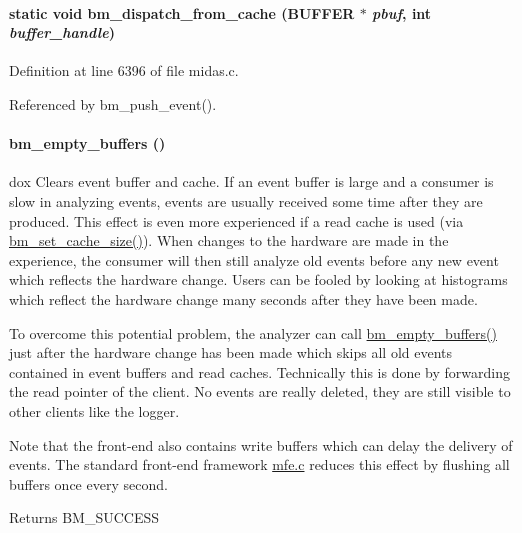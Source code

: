 \paragraph[{bm\_\-dispatch\_\-from\_\-cache}]{\setlength{\rightskip}{0pt plus 5cm}static void bm\_\-dispatch\_\-from\_\-cache ({\bf BUFFER} $\ast$ {\em pbuf}, \/  int {\em buffer\_\-handle})}\hfill\label{group__bmfunctionc_gae17352acfb63e945e2e932ca92156da2}


Definition at line 6396 of file midas.c.

Referenced by bm\_\-push\_\-event().
\paragraph[{bm\_\-empty\_\-buffers}]{ bm\_\-empty\_\-buffers ()}\hfill\label{group__bmfunctionc_ga516c50d818df89f466ac1fc135120fa6}
dox Clears event buffer and cache. If an event buffer is large and a consumer is slow in analyzing events, events are usually received some time after they are produced. This effect is even more experienced if a read cache is used (via \hyperlink{group__bmfunctionc_ga2689ca85c6d0023f1a02e6827a5eff6e}{bm\_\-set\_\-cache\_\-size()}). When changes to the hardware are made in the experience, the consumer will then still analyze old events before any new event which reflects the hardware change. Users can be fooled by looking at histograms which reflect the hardware change many seconds after they have been made.

To overcome this potential problem, the analyzer can call \hyperlink{group__bmfunctionc_ga516c50d818df89f466ac1fc135120fa6}{bm\_\-empty\_\-buffers()} just after the hardware change has been made which skips all old events contained in event buffers and read caches. Technically this is done by forwarding the read pointer of the client. No events are really deleted, they are still visible to other clients like the logger.

Note that the front-\/end also contains write buffers which can delay the delivery of events. The standard front-\/end framework \hyperlink{mfe_8c}{mfe.c} reduces this effect by flushing all buffers once every second. \begin{DoxyReturn}{Returns}
BM\_\-SUCCESS 
\end{DoxyReturn}


